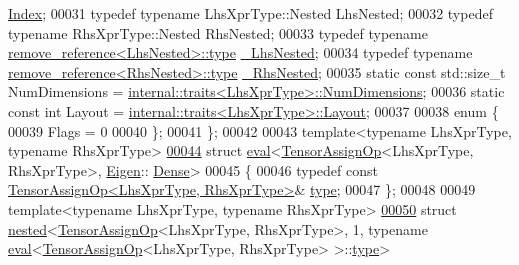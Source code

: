 \begin{DoxyCode}
      \hyperlink{namespace_eigen_a62e77e0933482dafde8fe197d9a2cfde}{Index};
00031   \textcolor{keyword}{typedef} \textcolor{keyword}{typename} LhsXprType::Nested LhsNested;
00032   \textcolor{keyword}{typedef} \textcolor{keyword}{typename} RhsXprType::Nested RhsNested;
00033   \textcolor{keyword}{typedef} \textcolor{keyword}{typename} \hyperlink{group___sparse_core___module}{remove\_reference<LhsNested>::type} 
      \hyperlink{group___sparse_core___module}{\_LhsNested};
00034   \textcolor{keyword}{typedef} \textcolor{keyword}{typename} \hyperlink{group___sparse_core___module}{remove\_reference<RhsNested>::type} 
      \hyperlink{group___sparse_core___module}{\_RhsNested};
00035   \textcolor{keyword}{static} \textcolor{keyword}{const} std::size\_t NumDimensions = 
      \hyperlink{struct_eigen_1_1internal_1_1traits}{internal::traits<LhsXprType>::NumDimensions};
00036   \textcolor{keyword}{static} \textcolor{keyword}{const} \textcolor{keywordtype}{int} Layout = \hyperlink{struct_eigen_1_1internal_1_1traits}{internal::traits<LhsXprType>::Layout};
00037 
00038   \textcolor{keyword}{enum} \{
00039     Flags = 0
00040   \};
00041 \};
00042 
00043 \textcolor{keyword}{template}<\textcolor{keyword}{typename} LhsXprType, \textcolor{keyword}{typename} RhsXprType>
\hyperlink{struct_eigen_1_1internal_1_1eval_3_01_tensor_assign_op_3_01_lhs_xpr_type_00_01_rhs_xpr_type_01_4_00_01_eigen_1_1_dense_01_4}{00044} \textcolor{keyword}{struct }\hyperlink{struct_eigen_1_1internal_1_1eval}{eval}<\hyperlink{class_eigen_1_1_tensor_assign_op}{TensorAssignOp}<LhsXprType, RhsXprType>, \hyperlink{namespace_eigen}{Eigen}::
      \hyperlink{struct_eigen_1_1_dense}{Dense}>
00045 \{
00046   \textcolor{keyword}{typedef} \textcolor{keyword}{const} \hyperlink{class_eigen_1_1_tensor_assign_op}{TensorAssignOp<LhsXprType, RhsXprType>}& 
      \hyperlink{class_eigen_1_1_tensor_assign_op}{type};
00047 \};
00048 
00049 \textcolor{keyword}{template}<\textcolor{keyword}{typename} LhsXprType, \textcolor{keyword}{typename} RhsXprType>
\hyperlink{struct_eigen_1_1internal_1_1nested_3_01_tensor_assign_op_3_01_lhs_xpr_type_00_01_rhs_xpr_type_01d4159a152a0e6ba4b4de0b2584842bf3}{00050} \textcolor{keyword}{struct }\hyperlink{struct_eigen_1_1internal_1_1nested}{nested}<\hyperlink{class_eigen_1_1_tensor_assign_op}{TensorAssignOp}<LhsXprType, RhsXprType>, 1, typename 
      \hyperlink{struct_eigen_1_1internal_1_1eval}{eval}<\hyperlink{class_eigen_1_1_tensor_assign_op}{TensorAssignOp}<LhsXprType, RhsXprType> >::\hyperlink{class_eigen_1_1_tensor_assign_op}{type}>

\end{DoxyCode}
